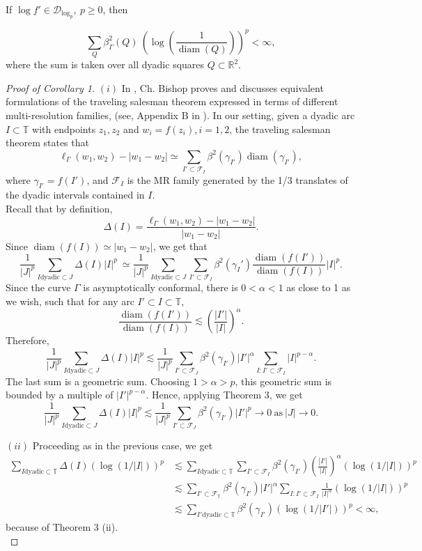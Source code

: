 \documentclass[12pt,a4paper]{article}
\theoremstyle{definition}
\theoremstyle{remark}
\newcommand{\T}{\mathbb{T}}
\newcommand{\diam}{\operatorname{diam}}
\numberwithin{komcounter}{section}
\begin{document}
If $\log f'\in \mathcal{D}_{\log_p},~p\geq 0$, then
 
$$\sum_{ Q} \beta^2_ \Gamma (Q)~\left(\log \left(\frac {1}{\diam(Q)}\right)\right)^p<\infty,$$
where the sum is taken over all dyadic squares $Q \subset \mathbb{R}^2$.


\begin{proof}[Proof of Corollary 1]
	
 $(i)$ In \cite{b2}, Ch. Bishop proves and discusses  equivalent formulations of the traveling salesman theorem expressed in terms of different multi-resolution families, (see, Appendix B in  \cite{b2}). In our setting, given a dyadic arc $I\subset \T$ with endpoints $z_1, z_2$  and $w_i=f(z_i), i=1,2$, the traveling salesman theorem states that
$$\ell_\Gamma(w_1,w_2)-|w_1-w_2| \simeq \sum_{I' \subset \mathcal{F}_I } \beta^2(\gamma_{I'} )\diam( \gamma_{I'}),$$
where $\gamma_{I'}=f(I')$, and $\mathcal{F}_I$ is the MR family generated by the 1/3 translates of the dyadic intervals contained in $I$.\\
Recall that by definition,
$$
\Delta (I )= \frac{\ell_\Gamma(w_1,w_2)-|w_1-w_2|}{|w_1-w_2|}.
$$
Since  $\diam( f(I))\simeq |w_1-w_2|$,  we get that 
$$\frac{1}{|J|^p}\sum_{I \textrm{dyadic}\subset J} \Delta (I) |I|^p~	\simeq \frac{1}{|J|^p}\sum_{I \textrm{dyadic}\subset J} 
\sum_{I'  \subset \mathcal{F}_I} \beta^2 (\gamma_I')\frac{\diam( f(I'))}{\diam( f(I))}  |I|^p.
	$$
	Since the curve $\Gamma$ is  asymptotically conformal, there   is $0<\alpha<1$ as close to 1 as we wish, such that for any arc $I'\subset I \subset \T$,
	$$
	\frac{\diam( f(I'))}{\diam( f(I))}\lesssim \left(\frac{|I'|}{|I|}\right)^\alpha.
	$$
	Therefore, 
	$$\frac{1}{|J|^p}\sum_{I \textrm{dyadic}\subset J} \Delta (I) |I|^p\lesssim \frac{1}{|J|^p} \sum_{I'  \subset \mathcal{F}_J} \beta^2 (\gamma_{I'})|I'|^\alpha \sum_{I:I'  \subset \mathcal{F}_I  }|I|^{p-\alpha}.
	$$
	The last sum is a geometric sum. Choosing  $1>\alpha>p$, this geometric sum  is bounded by a multiple of $|I'|^{p-\alpha}.$ Hence, applying Theorem 3, we get
	$$\frac{1}{|J|^p}\sum_{I \textrm{dyadic}\subset J} \Delta (I) |I|^p\lesssim \frac{1}{|J|^p} \sum_{I'  \subset \mathcal{F}_J} \beta^2 (\gamma_{I'})|I'|^p\to 0~\textrm{as}\ |J|\to 0.$$
	
	$(ii)$ Proceeding as in the previous case, we get
	\begin{align}\nonumber
	\sum_{I \textrm{dyadic}\subset \T} \Delta (I) (\log (1/ |I|))^p& \lesssim \sum_{I \textrm{dyadic}\subset \T} 
	\sum_{I'  \subset \mathcal{F}_I} \beta^2 (\gamma_{I'}) \left(\frac{|I'|}{|I|}\right)^\alpha (\log (1/ |I|))^p\\\nonumber&
		\lesssim \sum_{I'  \subset \mathcal{F}_\T}\beta^2 (\gamma_{I'})  |I'|^\alpha \sum_{I:I'  \subset \mathcal{F}_I}\frac{1}{|I|^\alpha}(\log (1/ |I|))^p\\\nonumber&\lesssim \sum_{I' \textrm{dyadic}\subset \T}\beta^2 (\gamma_{I'}) (\log (1/ |I'|))^p<\infty,\nonumber
		\end{align}
		because of  Theorem 3 (ii).\\
		
		
	
	
	
	
		
	
\end{proof}
\end{document}
